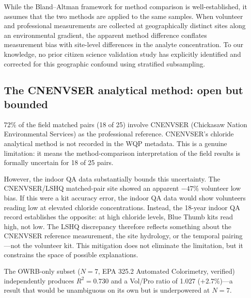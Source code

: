 \documentclass[lineno]{wlpeerj}
\begin{document}
While the Bland--Altman framework for method comparison \citep{BlandAltman1986} is well-established, it assumes that the two methods are applied to the same samples. When volunteer and professional measurements are collected at geographically distinct sites along an environmental gradient, the apparent method difference conflates measurement bias with site-level differences in the analyte concentration. To our knowledge, no prior citizen science validation study has explicitly identified and corrected for this geographic confound using stratified subsampling.

\subsection{The CNENVSER analytical method: open but bounded}
\label{sec:cnenvser}

72\% of the field matched pairs (18 of 25) involve CNENVSER (Chickasaw Nation Environmental Services) as the professional reference. CNENVSER's chloride analytical method is not recorded in the WQP metadata. This is a genuine limitation: it means the method-comparison interpretation of the field results is formally uncertain for 18 of 25 pairs.


However, the indoor QA data substantially bounds this uncertainty. The CNENVSER/LSHQ matched-pair site showed an apparent $-47\%$ volunteer low bias. If this were a kit accuracy error, the indoor QA data would show volunteers reading low at elevated chloride concentrations. Instead, the 18-year indoor QA record establishes the opposite: at high chloride levels, Blue Thumb kits read high, not low. The LSHQ discrepancy therefore reflects something about the CNENVSER reference measurement, the site hydrology, or the temporal pairing---not the volunteer kit. This mitigation does not eliminate the limitation, but it constrains the space of possible explanations.

The OWRB-only subset ($N=7$, EPA 325.2 Automated Colorimetry, verified) independently produces $R^{2} = 0.730$ and a Vol/Pro ratio of 1.027 ($+2.7\%$)---a result that would be unambiguous on its own but is underpowered at $N=7$.

\end{document}
